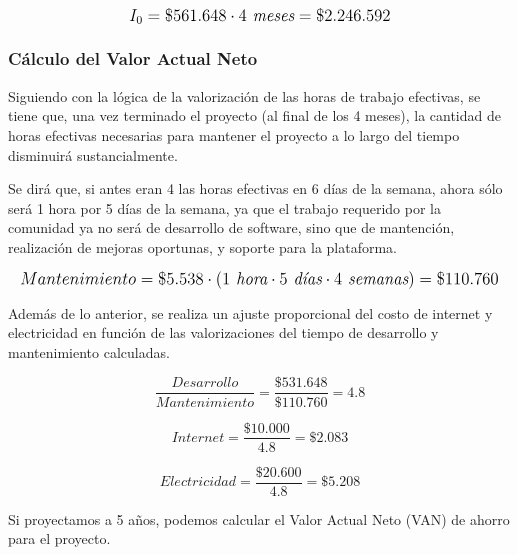 \[
\mathlarger{
	{I_0} = \$561.648 \cdot 4\textit{ meses}= \$2.246.592
}
\]

\subsubsection{Cálculo del Valor Actual Neto}
Siguiendo con la lógica de la valorización de las horas de trabajo efectivas, se tiene que, una vez terminado el proyecto (al final de los 4 meses), la cantidad de horas efectivas necesarias para mantener el proyecto a lo largo del tiempo disminuirá sustancialmente.

Se dirá que, si antes eran 4 las horas efectivas en 6 días de la semana, ahora sólo será 1 hora por 5 días de la semana, ya que el trabajo requerido por la comunidad ya no será de desarrollo de software, sino que de mantención, realización de mejoras oportunas, y soporte para la plataforma.

\[
\mathlarger{
	Mantenimiento = \$5.538 \cdot \left(1 \textit{ hora}\cdot5 \textit{ días}\cdot4 \textit{ semanas}\right) = \$110.760
}
\]

Además de lo anterior, se realiza un ajuste proporcional del costo de internet y electricidad en función de las valorizaciones del tiempo de desarrollo y mantenimiento calculadas.

\[
\frac{Desarrollo}{Mantenimiento} = \frac{\$531.648}{\$110.760} = 4.8
\]

\[
Internet = \frac{\$10.000}{4.8} = \$2.083
\]

\[
Electricidad = \frac{\$20.600}{4.8} = \$5.208
\]

Si proyectamos a 5 años, podemos calcular el Valor Actual Neto (VAN) de ahorro para el proyecto.

